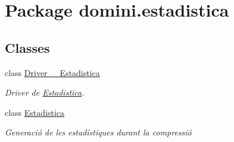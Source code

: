 \hypertarget{namespacedomini_1_1estadistica}{}\section{Package domini.\+estadistica}
\label{namespacedomini_1_1estadistica}
\subsection*{Classes}
\begin{DoxyCompactItemize}
\item 
class \hyperlink{classdomini_1_1estadistica_1_1Driver____Estadistica}{Driver\+\_\+\+\_\+\+Estadistica}
\begin{DoxyCompactList}\small\item\em Driver de \hyperlink{classdomini_1_1estadistica_1_1Estadistica}{Estadistica}. \end{DoxyCompactList}\item 
class \hyperlink{classdomini_1_1estadistica_1_1Estadistica}{Estadistica}
\begin{DoxyCompactList}\small\item\em Generació de les estadístiques durant la compressió \end{DoxyCompactList}\end{DoxyCompactItemize}
